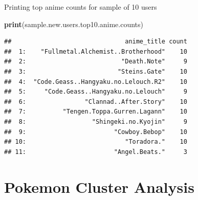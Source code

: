 \documentclass[
  ignorenonframetext,
]{beamer}
\newenvironment{Shaded}{\begin{snugshade}}{\end{snugshade}}
\newcommand{\KeywordTok}[1]{\textcolor[rgb]{0.13,0.29,0.53}{\textbf{#1}}}
\newcommand{\NormalTok}[1]{#1}
\begin{document}
\begin{frame}[fragile]{Printing top anime counts for sample of 10 users}
\protect\hypertarget{printing-top-anime-counts-for-sample-of-10-users}{}

\begin{Shaded}
\begin{Highlighting}[]
\KeywordTok{print}\NormalTok{(sample.new.users.top10.anime.counts)}
\end{Highlighting}
\end{Shaded}

\begin{verbatim}
##                               anime_title count
##  1:    "Fullmetal.Alchemist..Brotherhood"    10
##  2:                          "Death.Note"     9
##  3:                         "Steins.Gate"    10
##  4:  "Code.Geass..Hangyaku.no.Lelouch.R2"    10
##  5:     "Code.Geass..Hangyaku.no.Lelouch"     9
##  6:                "Clannad..After.Story"    10
##  7:          "Tengen.Toppa.Gurren.Lagann"    10
##  8:                  "Shingeki.no.Kyojin"     9
##  9:                        "Cowboy.Bebop"    10
## 10:                           "Toradora."    10
## 11:                        "Angel.Beats."     3
\end{verbatim}

\end{frame}

\hypertarget{pokemon-cluster-analysis}{%
\section{Pokemon Cluster Analysis}\label{pokemon-cluster-analysis}}
\end{document}
